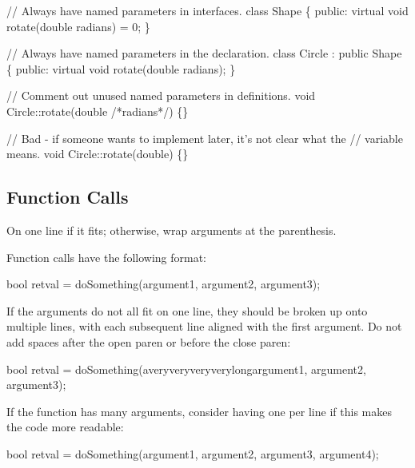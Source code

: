 \begin{DoxyCode}
\textcolor{comment}{// Always have named parameters in interfaces.}
\textcolor{keyword}{class }Shape
\{
\textcolor{keyword}{public}:
    \textcolor{keyword}{virtual} \textcolor{keywordtype}{void} rotate(\textcolor{keywordtype}{double} radians) = 0;
\}

\textcolor{comment}{// Always have named parameters in the declaration.}
\textcolor{keyword}{class }Circle : \textcolor{keyword}{public} Shape
\{
\textcolor{keyword}{public}:
    \textcolor{keyword}{virtual} \textcolor{keywordtype}{void} rotate(\textcolor{keywordtype}{double} radians);
\}

\textcolor{comment}{// Comment out unused named parameters in definitions.}
\textcolor{keywordtype}{void} Circle::rotate(\textcolor{keywordtype}{double} \textcolor{comment}{/*radians*/})
\{\}

\textcolor{comment}{// Bad - if someone wants to implement later, it's not clear what the}
\textcolor{comment}{// variable means.}
\textcolor{keywordtype}{void} Circle::rotate(\textcolor{keywordtype}{double})
\{\}
\end{DoxyCode}


\subsection*{Function Calls}

On one line if it fits; otherwise, wrap arguments at the parenthesis.

Function calls have the following format\+:


\begin{DoxyCode}
\textcolor{keywordtype}{bool} retval = doSomething(argument1, argument2, argument3);
\end{DoxyCode}


If the arguments do not all fit on one line, they should be broken up onto multiple lines, with each subsequent line aligned with the first argument. Do not add spaces after the open paren or before the close paren\+:


\begin{DoxyCode}
\textcolor{keywordtype}{bool} retval = doSomething(averyveryveryverylongargument1,
                          argument2, argument3);
\end{DoxyCode}


If the function has many arguments, consider having one per line if this makes the code more readable\+:


\begin{DoxyCode}
\textcolor{keywordtype}{bool} retval = doSomething(argument1,
                          argument2,
                          argument3,
                          argument4);
\end{DoxyCode}


